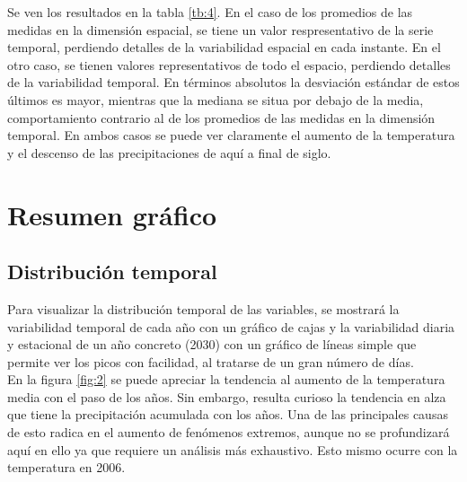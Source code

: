 \documentclass[9pt,twocolumn,twoside]{opticajnl}
\begin{document}
Se ven los resultados en la tabla \ref{tb:4}. En el caso de los promedios de las medidas en la dimensión espacial, se tiene un valor respresentativo de la serie temporal, perdiendo detalles de la variabilidad espacial en cada instante. En el otro caso, se tienen valores representativos de todo el espacio, perdiendo detalles de la variabilidad temporal. En términos absolutos la desviación estándar de estos últimos es mayor, mientras que la mediana se situa por debajo de la media, comportamiento contrario al de los promedios de las medidas en la dimensión temporal. En ambos casos se puede ver claramente el aumento de la temperatura y el descenso de las precipitaciones de aquí a final de siglo.


\section{Resumen gráfico}

\subsection{Distribución temporal}

Para visualizar la distribución temporal de las variables, se mostrará la variabilidad temporal de cada año con un gráfico de cajas y la variabilidad diaria y estacional de un año concreto (2030) con un gráfico de líneas simple que permite ver los picos con facilidad, al tratarse de un gran número de días. \\

En la figura \ref{fig:2} se puede apreciar la tendencia al aumento de la temperatura media con el paso de los años. Sin embargo, resulta curioso la tendencia en alza que tiene la precipitación acumulada con los años. Una de las principales causas de esto radica en el aumento de fenómenos extremos, aunque no se profundizará aquí en ello ya que requiere un análisis más exhaustivo. Esto mismo ocurre con la temperatura en 2006.\\
\end{document}
